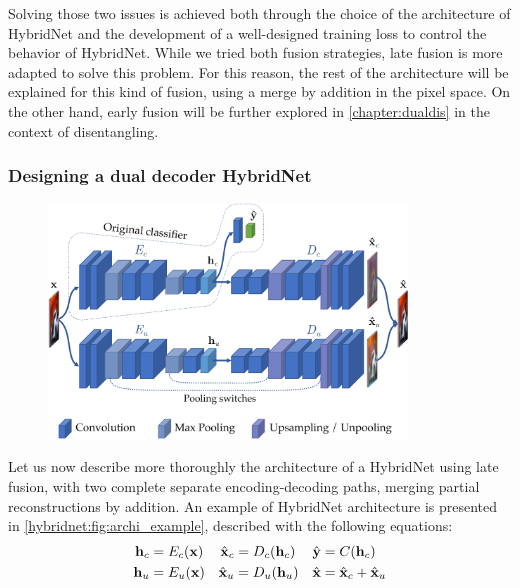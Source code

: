 Solving those two issues is achieved both through the choice of the architecture of HybridNet and the development of a well-designed training loss to control the behavior of HybridNet. While we tried both fusion strategies, late fusion is more adapted to solve this problem. For this reason, the rest of the architecture will be explained for this kind of fusion, using a merge by addition in the pixel space. On the other hand, early fusion will be further explored in \autoref{chapter:dualdis} in the context of disentangling.


\subsubsection{Designing a dual decoder HybridNet}

\begin{figure}[t]
  \centering
  \includegraphics[width=0.85\textwidth]{images/hybridnet_archi_example}
  \label{hybridnet:fig:archi_example}
\end{figure}


Let us now describe more thoroughly the architecture of a HybridNet using late fusion, \ie with two complete separate encoding-decoding paths, merging partial reconstructions by addition. An example of HybridNet architecture is presented in \autoref{hybridnet:fig:archi_example}, described with the following equations:
\begin{align}		
	\mathbf{h}_c &= E_c(\mathbf{x}) & \hat{\mathbf{x}}_c &= D_c(\mathbf{h}_c) & \hat{\mathbf{y}} &= C(\mathbf{h}_c)\\		
	\mathbf{h}_u &= E_u(\mathbf{x}) & \hat{\mathbf{x}}_u &= D_u(\mathbf{h}_u) & \hat{\mathbf{x}} &= \hat{\mathbf{x}}_c + \hat{\mathbf{x}}_u		
\end{align}	

